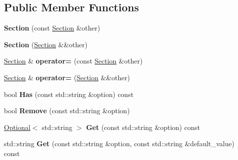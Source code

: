 \subsection*{Public Member Functions}
\begin{DoxyCompactItemize}
\item 
{\bfseries Section} (const \hyperlink{classlog2hdfs_1_1Section}{Section} \&other)\hypertarget{classlog2hdfs_1_1Section_adfaa5487e6313183cfb00f289a446278}{}\label{classlog2hdfs_1_1Section_adfaa5487e6313183cfb00f289a446278}

\item 
{\bfseries Section} (\hyperlink{classlog2hdfs_1_1Section}{Section} \&\&other)\hypertarget{classlog2hdfs_1_1Section_ab6e5e412a379873b636b2f0b9d51b7a9}{}\label{classlog2hdfs_1_1Section_ab6e5e412a379873b636b2f0b9d51b7a9}

\item 
\hyperlink{classlog2hdfs_1_1Section}{Section} \& {\bfseries operator=} (const \hyperlink{classlog2hdfs_1_1Section}{Section} \&other)\hypertarget{classlog2hdfs_1_1Section_ad9d6b66ff1ad2ffa7157ca7ff7a0e2c5}{}\label{classlog2hdfs_1_1Section_ad9d6b66ff1ad2ffa7157ca7ff7a0e2c5}

\item 
\hyperlink{classlog2hdfs_1_1Section}{Section} \& {\bfseries operator=} (\hyperlink{classlog2hdfs_1_1Section}{Section} \&\&other)\hypertarget{classlog2hdfs_1_1Section_a393bc4b0296173e4d2346f34ca9c0789}{}\label{classlog2hdfs_1_1Section_a393bc4b0296173e4d2346f34ca9c0789}

\item 
bool {\bfseries Has} (const std\+::string \&option) const \hypertarget{classlog2hdfs_1_1Section_a84000e3a5bcfd6e3b8ab219b038632e8}{}\label{classlog2hdfs_1_1Section_a84000e3a5bcfd6e3b8ab219b038632e8}

\item 
bool {\bfseries Remove} (const std\+::string \&option)\hypertarget{classlog2hdfs_1_1Section_aed0b35b429f51cd66f62d55153765be1}{}\label{classlog2hdfs_1_1Section_aed0b35b429f51cd66f62d55153765be1}

\item 
\hyperlink{classlog2hdfs_1_1Optional}{Optional}$<$ std\+::string $>$ {\bfseries Get} (const std\+::string \&option) const \hypertarget{classlog2hdfs_1_1Section_a5db65fc853dcde4963629a9117ccbb34}{}\label{classlog2hdfs_1_1Section_a5db65fc853dcde4963629a9117ccbb34}

\item 
std\+::string {\bfseries Get} (const std\+::string \&option, const std\+::string \&default\+\_\+value) const \hypertarget{classlog2hdfs_1_1Section_acd4eede29a5e80c7a5fefe759a49b9e1}{}\label{classlog2hdfs_1_1Section_acd4eede29a5e80c7a5fefe759a49b9e1}


\end{DoxyCompactItemize}

